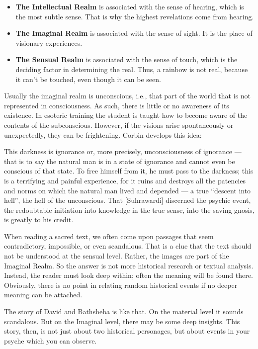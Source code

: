 \begin{itemize}
\item \textbf{The Intellectual Realm} is associated with the sense of hearing, which is the most subtle sense. That is why the highest revelations come from hearing. 
\item \textbf{The Imaginal Realm} is associated with the sense of sight. It is the place of visionary experiences. 
\item \textbf{The Sensual Realm} is associated with the sense of touch, which is the deciding factor in determining the real. Thus, a rainbow is not real, because it can't be touched, even though it can be seen. 
\end{itemize}
Usually the imaginal realm is unconscious, i.e., that part of the world that is not represented in consciousness. As such, there is little or no awareness of its existence. In esoteric training the student is taught how to become aware of the contents of the subconscious. However, if the visions arise spontaneously or unexpectedly, they can be frightening. Corbin develops this idea:

\begin{quotex}
This darkness is ignorance or, more precisely, unconsciousness of ignorance — that is to say the natural man is in a state of ignorance and cannot even be conscious of that state. To free himself from it, he must pass to the darkness; this is a terrifying and painful experience, for it ruins and destroys all the patencies and norms on which the natural man lived and depended — a true “descent into hell”, the hell of the unconscious. That [Suhrawardi] discerned the psychic event, the redoubtable initiation into knowledge in the true sense, into the saving gnosis, is greatly to his credit.

\end{quotex}
When reading a sacred text, we often come upon passages that seem contradictory, impossible, or even scandalous. That is a clue that the text should not be understood at the sensual level. Rather, the images are part of the Imaginal Realm. So the answer is not more historical research or textual analysis. Instead, the reader must look deep within; often the meaning will be found there. Obviously, there is no point in relating random historical events if no deeper meaning can be attached.

The story of David and Bathsheba is like that. On the material level it sounds scandalous. But on the Imaginal level, there may be some deep insights. This story, then, is not just about two historical personages, but about events in your psyche which you can observe.

